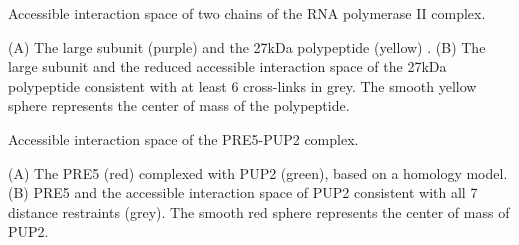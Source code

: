 \caption{Accessible interaction space of two chains of the RNA polymerase II complex.}
{(A) The large subunit (purple) and the 27kDa polypeptide (yellow) . (B) The
large subunit and the reduced accessible interaction space of the 27kDa
polypeptide consistent with at least 6 cross-links in grey. The smooth yellow
sphere represents the center of mass of the polypeptide.}
\stopbuffer


\caption{Accessible interaction space of the PRE5-PUP2 complex.}
{(A) The PRE5 (red) complexed with PUP2 (green), based on a homology model.
(B) PRE5 and the accessible interaction space of PUP2 consistent with all 7
distance restraints (grey). The smooth red sphere represents the center of mass
of PUP2.}
\stopbuffer
